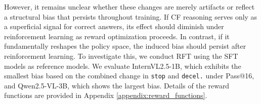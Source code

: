 \documentclass{article}
\begin{document}
However, it remains unclear whether these changes are merely artifacts or reflect a structural bias that persists throughout training. If CF reasoning serves only as a superficial signal for correct answers, its effect should diminish under reinforcement learning as reward optimization proceeds. In contrast, if it fundamentally reshapes the policy space, the induced bias should persist after reinforcement learning. To investigate this, we conduct RFT using the SFT models as reference models. We evaluate InternVL2.5-1B, which exhibits the smallest bias based on the combined change in \texttt{stop} and \texttt{decel.} under Pass@16, and Qwen2.5-VL-3B, which shows the largest bias. Details of the reward functions are provided in Appendix \ref{appendix:reward_functions}.
\end{document}
